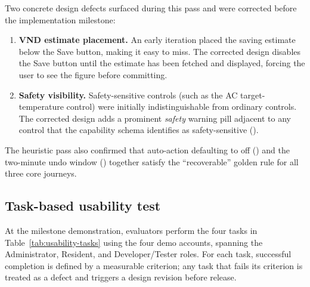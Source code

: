 Two concrete design defects surfaced during this pass and were corrected before the
implementation milestone:

\begin{enumerate}
  \item \textbf{VND estimate placement.}  An early iteration placed the saving estimate
        below the Save button, making it easy to miss.  The corrected design disables
        the Save button until the estimate has been fetched and displayed, forcing the
        user to see the figure before committing.
  \item \textbf{Safety visibility.}  Safety-sensitive controls (such as the AC
        target-temperature control) were initially indistinguishable from ordinary controls.  The corrected
        design adds a prominent \emph{safety} warning pill adjacent to any control that
        the capability schema identifies as safety-sensitive ().
\end{enumerate}

The heuristic pass also confirmed that auto-action defaulting to off () and
the two-minute undo window () together satisfy the ``recoverable'' golden
rule for all three core journeys.

\subsection{Task-based usability test}

At the milestone demonstration, evaluators perform the four tasks in
Table~\ref{tab:usability-tasks} using the four demo accounts, spanning the
Administrator, Resident, and Developer/Tester roles.  For each task, successful completion is defined by a measurable
criterion; any task that fails its criterion is treated as a defect and triggers a design
revision before release.

